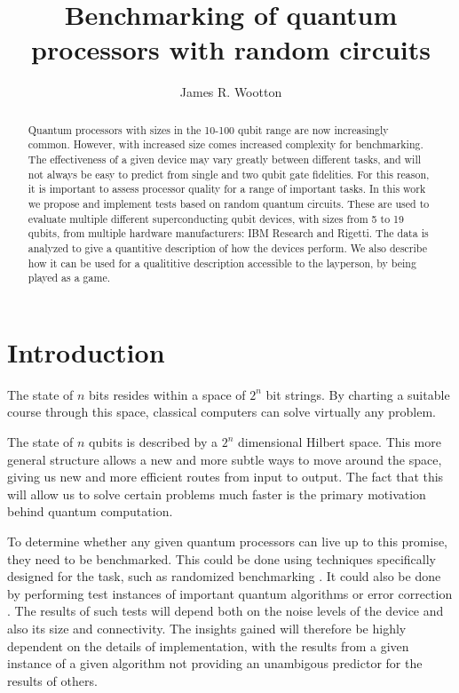 \documentclass[aps,prl,twocolumn,showpacs,preprintnumbers]{revtex4-1}
\begin{document}
\title{Benchmarking of quantum processors with random circuits}
\author{James R. Wootton}


\begin{abstract}

Quantum processors with sizes in the 10-100 qubit range are now increasingly common. However, with increased size comes increased complexity for benchmarking. The effectiveness of a given device may vary greatly between different tasks, and will not always be  easy to predict from single and two qubit gate fidelities. For this reason, it is important to assess processor quality for a range of important tasks. In this work we propose and implement tests based on random quantum circuits. These are used to evaluate multiple different superconducting qubit devices, with sizes from 5 to 19 qubits, from multiple hardware manufacturers: IBM Research and Rigetti. The data is analyzed to give a quantitive description of how the devices perform.  We also describe how it can be used for a qualititive description accessible to the layperson, by being played as a game.


\end{abstract}


\pacs{}

\maketitle


\section{Introduction}

The state of $n$ bits resides within a space of $2^n$ bit strings. By charting a suitable course through this space, classical computers can solve virtually any problem.

The state of $n$ qubits is described by a $2^n$ dimensional Hilbert space. This more general structure allows a new and more subtle ways to move around the space, giving us new and more efficient routes from input to output. The fact that this will allow us to solve certain problems much faster is the primary motivation behind quantum computation.

To determine whether any given quantum processors can live up to this promise, they need to be benchmarked. This could be done using techniques specifically designed for the task, such as randomized benchmarking \cite{}. It could also be done by performing test instances of important quantum algorithms \cite{} or error correction \cite{}. The results of such tests will depend both on the noise levels of the device and also its size and connectivity. The insights gained will therefore be highly dependent on the details of implementation, with the results from a given instance of a given algorithm not providing an unambigous predictor for the results of others.
\end{document}
